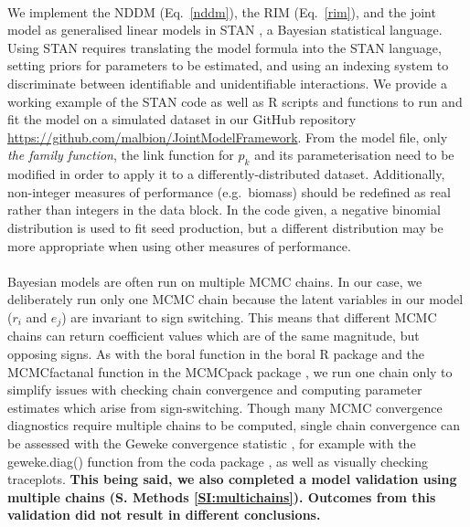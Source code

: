 \documentclass[a4,12pt]{article}
\begin{document}
\begin{refsection}
        \paragraph{}        
        We implement the NDDM (Eq.~\ref{nddm}), the RIM (Eq.~\ref{rim}), and the joint model as generalised linear models in STAN \parencite{Carpenter2017}, a Bayesian statistical language. Using STAN requires translating the model formula into the STAN language, setting priors for parameters to be estimated, and using an indexing system to discriminate between identifiable and unidentifiable interactions. We provide a working example of the STAN code as well as R scripts and functions to run and fit the model on a simulated dataset in our GitHub repository \url{https://github.com/malbion/JointModelFramework}.
        From the model file, only \textit{the family function}, the link function for $p_k$ and its parameterisation need to be modified in order to apply it to a differently-distributed dataset. Additionally, non-integer measures of performance (e.g.\ biomass) should be redefined as real rather than integers in the data block. In the code given, a negative binomial distribution is used to fit seed production, but a different distribution may be more appropriate when using other measures of performance.   

        \paragraph{}
        Bayesian models are often run on multiple MCMC chains. In our case, we deliberately run only one MCMC chain because the latent variables in our model ($r_i$ and $e_j$) are invariant to sign switching. This means that different MCMC chains can return coefficient values which are of the same magnitude, but opposing signs. As with the boral function in the boral R package \parencite{Hui2021} and the MCMCfactanal function in the MCMCpack package \parencite{Martin2011}, we run one chain only to simplify issues with checking chain convergence and computing parameter estimates which arise from sign-switching. Though many MCMC convergence diagnostics require multiple chains to be computed, single chain convergence can be assessed with the Geweke convergence statistic \parencite{Geweke1992}, for example with the geweke.diag() function from the coda package \parencite{Plummer2006}, as well as visually checking traceplots. \textbf{This being said, we also completed a model validation using multiple chains (S. Methods \ref{SI:multichains}). Outcomes from this validation did not result in different conclusions.}


\end{refsection}
\end{document}
